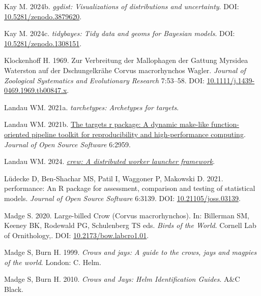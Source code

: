 \documentclass[10pt,a4paper]{article}
\newlength{\cslhangindent}
\newenvironment{CSLReferences}[2] %
 {\begin{list}{}{%
  \setlength{\itemindent}{0pt}
  \setlength{\leftmargin}{0pt}
  \setlength{\parsep}{0pt}
  \ifodd #1
   \setlength{\leftmargin}{\cslhangindent}
   \setlength{\itemindent}{-1\cslhangindent}
  \fi
  \setlength{\itemsep}{#2\baselineskip}}}
 {\end{list}}
\begin{document}
\begin{CSLReferences}{1}{0}
Kay M. 2024b. \emph{{ggdist}: Visualizations of distributions and uncertainty}. DOI: \href{https://doi.org/10.5281/zenodo.3879620}{10.5281/zenodo.3879620}.

Kay M. 2024c. \emph{{tidybayes}: Tidy data and geoms for {Bayesian} models}. DOI: \href{https://doi.org/10.5281/zenodo.1308151}{10.5281/zenodo.1308151}.

Klockenhoff H. 1969. Zur {Verbreitung} der {Mallophagen} der {Gattung} {Myrsidea} {Waterston} auf der {Dschungelkrähe} {Corvus} macrorhynchos {Wagler}. \emph{Journal of Zoological Systematics and Evolutionary Research} 7:53--58. DOI: \href{https://doi.org/10.1111/j.1439-0469.1969.tb00847.x}{10.1111/j.1439-0469.1969.tb00847.x}.

Landau WM. 2021a. \emph{{tarchetypes}: Archetypes for targets}.

Landau WM. 2021b. \href{https://doi.org/10.21105/joss.02959}{The targets r package: A dynamic make-like function-oriented pipeline toolkit for reproducibility and high-performance computing}. \emph{Journal of Open Source Software} 6:2959.

Landau WM. 2024. \emph{\href{https://CRAN.R-project.org/package=crew}{{crew}: A distributed worker launcher framework}}.

Lüdecke D, Ben-Shachar MS, Patil I, Waggoner P, Makowski D. 2021. {performance}: An {R} package for assessment, comparison and testing of statistical models. \emph{Journal of Open Source Software} 6:3139. DOI: \href{https://doi.org/10.21105/joss.03139}{10.21105/joss.03139}.

Madge S. 2020. Large-billed {Crow} ({Corvus} macrorhynchos). In: Billerman SM, Keeney BK, Rodewald PG, Schulenberg TS eds. \emph{Birds of the {World}}. Cornell Lab of Ornithology,. DOI: \href{https://doi.org/10.2173/bow.labcro1.01}{10.2173/bow.labcro1.01}.

Madge S, Burn H. 1999. \emph{Crows and jays: A guide to the crows, jays and magpies of the world}. London: C. Helm.

Madge S, Burn H. 2010. \emph{Crows and {Jays}: {Helm} {Identification} {Guides}}. A\&C Black.


\end{CSLReferences}
\end{document}

